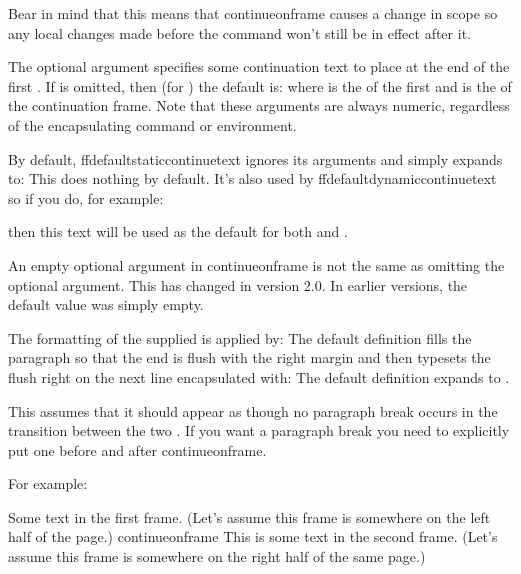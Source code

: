 \documentclass[fontsize=12pt]{scrbook}
\begin{document}
\begin{important}
Bear in mind that this means that \gls{continueonframe} causes a
change in scope so any local changes made before the command won't
still be in effect after it.
\end{important}

The optional argument  specifies some continuation text to place
at the end of the first .
If  is omitted, then (for ) the
default is:
where  is the  of the first 
and  is the  of the continuation frame.
Note that these arguments are always numeric, regardless of the
encapsulating command or environment.

By default, \gls{ffdefaultstaticcontinuetext} ignores its arguments and
simply expands to:
This does nothing by default. It's also used by
\gls{ffdefaultdynamiccontinuetext} so if you do, for
example:
\begin{codebox}
\end{codebox}
then this text will be used as the default for both
 and .

\begin{important}
An empty optional argument in \gls{continueonframe} is not the same
as omitting the optional argument. This has changed in version 2.0.
In earlier versions, the default value was simply empty.
\end{important}

The formatting of the supplied  is applied by:
The default definition fills the paragraph so that the end is flush
with the right margin and then typesets the  flush right
on the next line encapsulated with:
The default definition expands to 
.

\begin{important}
This assumes that it should appear as though no paragraph
break occurs in the transition between the two . If you 
want a paragraph break you need to explicitly put one before
and after \gls{continueonframe}.
\end{important}

For example:
\begin{codebox}
Some text in the first frame. (Let's
assume this frame is somewhere on the
left half of the page.)
\codepar
\gls{continueonframe}
\codepar
This is some text in the second frame. (Let's
assume this frame is somewhere on the
right half of the same page.)
\end{codebox}
\end{document}
